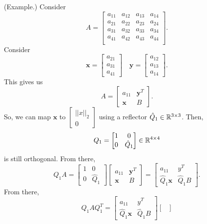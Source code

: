 \documentclass[letterpaper]{article}
\newcommand{\0}{\mathbf{0}}
\newcommand{\y}{\mathbf{y}}
\newcommand{\x}{\mathbf{x}}
\begin{document}
\begin{mdframed}
    (Example.) Consider 
    \[A = \begin{bmatrix}
        a_{11} & a_{12} & a_{13} & a_{14} \\ 
        a_{21} & a_{22} & a_{23} & a_{24} \\ 
        a_{31} & a_{32} & a_{33} & a_{34} \\ 
        a_{41} & a_{42} & a_{43} & a_{44} \\ 
    \end{bmatrix}.\]
    Consider \[\x = \begin{bmatrix}
        a_{21} \\ a_{31} \\ a_{41}
    \end{bmatrix} \quad \y = \begin{bmatrix}
        a_{12} \\ a_{13} \\ a_{14}
    \end{bmatrix}.\]
    This gives us 
    \[A = \begin{bmatrix}
        a_{11} & \y^T \\ 
        \x & B
    \end{bmatrix}.\]
    So, we can map $\x$ to $\begin{bmatrix}
        ||x||_2 \\ 0
    \end{bmatrix}$ using a reflector $\hat{Q}_1 \in \mathbb{R}^{3 \times 3}$. Then, 
    \[Q_1 = \begin{bmatrix}
        1 & 0 \\ 0 & \hat{Q}_1
    \end{bmatrix} \in \mathbb{R}^{4 \times 4}\] is still orthogonal. From there, \[Q_1 A = \begin{bmatrix}
        1 & 0 \\ 0 & \hat{Q}_1
    \end{bmatrix} \begin{bmatrix}
        a_{11} & \y^T \\ 
        \x & B 
    \end{bmatrix} = \begin{bmatrix}
        a_{11} & y^T \\ 
        \hat{Q}_1 \x & \hat{Q}_1 B
    \end{bmatrix}.\]
    From there, 
    \[Q_1 A Q_1^T = \begin{bmatrix}
        a_{11} & y^T \\ 
        \hat{Q}_1 \x & \hat{Q}_1 B
    \end{bmatrix} \begin{bmatrix}

\end{bmatrix}\]
\end{mdframed}
\end{document}
